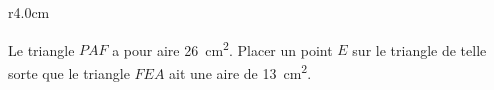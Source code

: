 
\begin{exercice}\label{exosmath-0959}

\begin{wrapfigure}{r}{4.0cm}
   \vspace{-0.7cm}        %
   \centering
   
\end{wrapfigure}

    Le triangle \( PAF\) a pour aire \SI{26}{\centi\meter\squared}. Placer un point \( E\) sur le triangle de telle sorte que le triangle \( FEA\) ait une aire de \SI{13}{\centi\meter\squared}.

\end{exercice}
